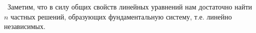 \documentclass[10pt, a5paper, twoside]{book}
\begin{document}
\indent\, Заметим, что в силу общих свойств линейных уравнений нам достаточно н\hspace{0.7mm}а\hspace{0.7mm}й\hspace{0.7mm}т\hspace{0.7mm}и\hspace{0.7mm} $n$\hspace{0.7mm} ч\hspace{0.7mm}а\hspace{0.7mm}с\hspace{0.7mm}т\hspace{0.7mm}н\hspace{0.7mm}ы\hspace{0.7mm}х\hspace{0.7mm} р\hspace{0.7mm}е\hspace{0.7mm}ш\hspace{0.7mm}е\hspace{0.7mm}н\hspace{0.7mm}и\hspace{0.7mm}й\hspace{0.7mm}, образующих фундаментальную систему, т.е. линейно независимых.
\end{document}
